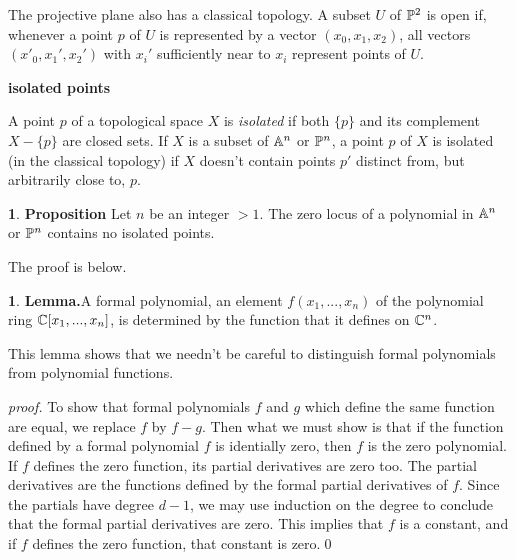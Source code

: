 \documentclass[leqno]{book}
\newcommand\Marginnote[1]{\marginnote{\hspace{-12pt}\normalfont{#1}}}
\renewcommand\theequation{\thesection.\arabic{equation}}
\newenvironment{boldequation}{\renewcommand\theequation{\textbf{\thesection.\arabic{equation}}}\equation}
   {\endequation}
\theoremstyle{definition}%
\numberwithin{equation}{section}
\theoremstyle{theorem} %
\newtheorem{lemma}[equation]{}
\newtheorem{proposition}[equation]{}
\renewenvironment{proof}{\no \emph{proof.}}{}
\begin{document}
The projective plane also has a classical topology.  A subset
$U$ of $\mathbb{P}^2$ is open if, whenever a point $p$ of $U$ is represented
by a vector $(x_0,x_1,x_2)$, all vectors $(x'_0,x_1',x_2')$ with
$x_i'$ sufficiently near to $x_i$ represent points of $U$. 


\begin{boldequation}\Marginnote{isopts}
\hspace{-10.5cm} \textbf{isolated points}
\label{isopts}\end{boldequation}

 A point $p$ of a topological space $X$ is {\it isolated}
 if both $\{p\}$ and its complement $X\!-\!\{p\}$ are closed sets.
If $X$ is a subset of $\mathbb{A}^n$ or $\mathbb{P}^n$, a point
 $p$ of $X$ is isolated (in the classical topology) if $X$
 doesn't contain points $p'$ distinct from, but arbitrarily close
 to, $p$.

\begin{proposition}{\bf Proposition}
\label{noisolatedpoint} Let $n$ be an integer $>
1$.  The zero locus of a polynomial in $\mathbb{A}^n$ or $\mathbb{P}^n$ contains
no isolated points.
\end{proposition}

The proof is below.

\begin{lemma}{\bf Lemma.}\label{polyfunction}
A formal polynomial, an element $f(x_1,...,x_n)$ of the polynomial
ring $\mathbb{C}[x_1,...,x_n]$, is determined by the function that it
defines on $\mathbb{C}^n$.
\end{lemma}

This lemma shows that  we needn't be careful to distinguish formal
polynomials from polynomial functions.


\begin{proof} 
To  show that formal polynomials $f$ and $g$ which define the
same function are equal, we replace $f$ by $f-g$.  Then what we must
show is that if the function defined by a formal polynomial $f$ is
identially zero, then $f$ is the zero polynomial.  If $f$ defines the
zero function, its partial derivatives are zero too. The partial
derivatives are the functions defined by the formal partial
derivatives of $f$.  Since the partials have degree $d-1$, we may use
induction on the degree to conclude that the formal partial
derivatives are zero.  This implies that $f$ is a constant, and if $f$
defines the zero function, that constant is zero.\qed\end{proof}
\end{document}
